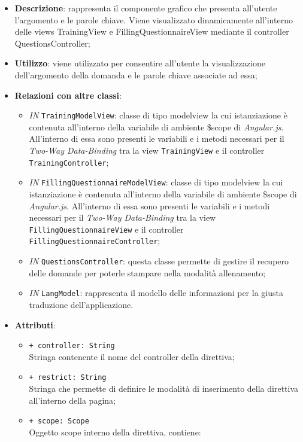 		\begin{itemize}
			\item \textbf{Descrizione}: rappresenta il componente grafico che presenta all'utente l'argomento e le parole chiave. Viene visualizzato dinamicamente all'interno delle views TrainingView e FillingQuestionnaireView mediante il controller QuestionsController;
			\item \textbf{Utilizzo}: viene utilizzato per consentire all'utente la visualizzazione dell'argomento della domanda e le parole chiave associate ad essa;
			\item \textbf{Relazioni con altre classi}: 
			\begin{itemize}
				\item \textit{IN} \texttt{TrainingModelView}: classe di tipo modelview la cui istanziazione è contenuta all'interno della variabile di ambiente \$scope di \textit{Angular.js}. All'interno di essa sono presenti le variabili e i metodi necessari per il \textit{Two-Way Data-Binding} tra la view \texttt{TrainingView} e il controller \texttt{TrainingController}; 
				\item \textit{IN} \texttt{FillingQuestionnaireModelView}: classe di tipo modelview la cui istanziazione è contenuta all'interno della variabile di ambiente \$scope di \textit{Angular.js}. All'interno di essa sono presenti le variabili e i metodi necessari per il \textit{Two-Way Data-Binding} tra la view \texttt{FillingQuestionnaireView} e il controller \texttt{FillingQuestionnaireController};
				\item \textit{IN} \texttt{QuestionsController}: questa classe permette di gestire il recupero delle domande per poterle stampare nella modalità allenamento;
				\item \textit{IN} \texttt{LangModel}: rappresenta il modello delle informazioni per la giusta traduzione dell'applicazione.
			\end{itemize}
			\item \textbf{Attributi}: 
			\begin{itemize}
				\item \texttt{+ controller: String} \\ Stringa contenente il nome del controller della direttiva;
				\item \texttt{+ restrict: String} \\ Stringa che permette di definire le modalità di inserimento della direttiva all'interno della pagina;
				\item \texttt{+ scope: Scope} \\ Oggetto scope interno della direttiva, contiene:

\end{itemize}
\end{itemize}
